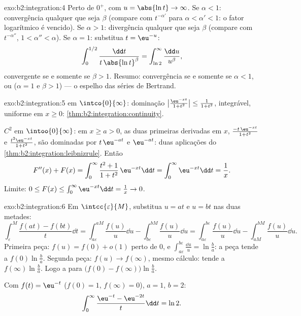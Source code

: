 \begin{solution}{exo:b2:integration:4}
Perto de $0^+$, com $u = \abs{\ln t} \to \infty$. Se $\alpha < 1$:
convergência qualquer que seja $\beta$ (compare com $t^{-\alpha'}$ para
$\alpha < \alpha' < 1$: o fator logarítmico é vencido). Se $\alpha > 1$:
divergência qualquer que seja $\beta$ (compare com $t^{-\alpha''}$,
$1 < \alpha'' < \alpha$). Se $\alpha = 1$: substitua $t =
\eu^{-u}$:
\[
\int_0^{1/2} \frac{\dd t}{t\,\abs{\ln t}^\beta}
= \int_{\ln 2}^{\infty} \frac{\dd u}{u^\beta},
\]
convergente se e somente se $\beta > 1$. Resumo: convergência se e somente se $\alpha < 1$,
ou ($\alpha = 1$ e $\beta > 1$) --- o espelho das séries
de Bertrand.
\end{solution}

\begin{solution}{exo:b2:integration:5}
 em $\intco{0}{\infty}$: dominação
$\bigl|\frac{\eu^{-xt}}{1+t^2}\bigr| \leq \frac{1}{1+t^2}$,
integrável, uniforme em $x \geq 0$:
\cref{thm:b2:integration:continuity}.

$C^2$ em $\intoo{0}{\infty}$: em $x \geq a > 0$, as duas primeiras
derivadas em $x$, $\frac{-t\,\eu^{-xt}}{1+t^2}$ e
$\frac{t^2\eu^{-xt}}{1+t^2}$, são dominadas por $t\,\eu^{-at}$ e
$\eu^{-at}$: duas aplicações do
\cref{thm:b2:integration:leibnizrule}. Então
\[
F''(x) + F(x) = \int_0^\infty \frac{t^2 + 1}{1 + t^2}\,\eu^{-xt}\dd
t = \int_0^\infty \eu^{-xt}\dd t = \frac1x .
\]
Limite: $0 \leq F(x) \leq \int_0^\infty \eu^{-xt}\dd t = \frac1x \to
0$.
\end{solution}

\begin{solution}{exo:b2:integration:6}
Em $\intcc{\varepsilon}{M}$, substitua $u = at$ e $u = bt$ nas
duas metades:
\[
\int_\varepsilon^M \frac{f(at) - f(bt)}{t}\dd t
= \int_{a\varepsilon}^{aM}\frac{f(u)}{u}\dd u
- \int_{b\varepsilon}^{bM}\frac{f(u)}{u}\dd u
= \int_{a\varepsilon}^{b\varepsilon} \frac{f(u)}{u}\dd u
- \int_{aM}^{bM} \frac{f(u)}{u}\dd u .
\]
Primeira peça: $f(u) = f(0) + o(1)$ perto de $0$, e $\int_{a\varepsilon}
^{b\varepsilon} \frac{\dd u}{u} = \ln\frac ba$: a peça tende a
$f(0)\ln\frac ba$. Segunda peça: $f(u) \to f(\infty)$, mesmo
cálculo: tende a $f(\infty)\ln\frac ba$. Logo a 
 para $\bigl(f(0) - f(\infty)\bigr)\ln\frac ba$.

Com $f(t) = \eu^{-t}$ ($f(0) = 1$, $f(\infty) = 0$), $a = 1$, $b
= 2$:
\[
\int_0^\infty \frac{\eu^{-t} - \eu^{-2t}}{t}\dd t = \ln 2 .
\]
\end{solution}

